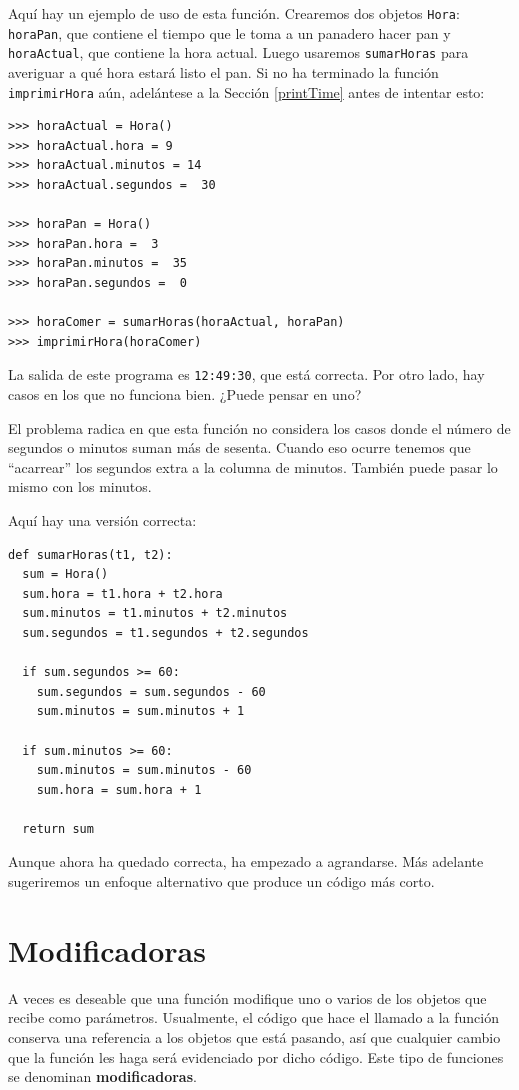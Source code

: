 Aquí hay un ejemplo de uso de esta función. Crearemos dos objetos
\texttt{Hora}: \texttt{horaPan}, que contiene el tiempo que le toma
a un panadero hacer pan y \texttt{horaActual}, que contiene la hora
actual. Luego usaremos \texttt{sumarHoras} para averiguar a qué hora
estará listo el pan. Si no ha terminado la función \texttt{imprimirHora}
aún, adelántese a la Sección \ref{printTime} antes de intentar esto:

\begin{verbatim}
>>> horaActual = Hora()
>>> horaActual.hora = 9
>>> horaActual.minutos = 14
>>> horaActual.segundos =  30

>>> horaPan = Hora()
>>> horaPan.hora =  3
>>> horaPan.minutos =  35
>>> horaPan.segundos =  0

>>> horaComer = sumarHoras(horaActual, horaPan)
>>> imprimirHora(horaComer)
\end{verbatim}
 La salida de este programa es \texttt{12:49:30}, que está correcta.
Por otro lado, hay casos en los que no funciona bien. ¿Puede pensar
en uno?

El problema radica en que esta función no considera los casos donde
el número de segundos o minutos suman más de sesenta. Cuando eso ocurre
tenemos que ``acarrear'' los segundos extra a la columna de minutos.
También puede pasar lo mismo con los minutos.

Aquí hay una versión correcta:
\begin{verbatim}
def sumarHoras(t1, t2):
  sum = Hora()
  sum.hora = t1.hora + t2.hora
  sum.minutos = t1.minutos + t2.minutos
  sum.segundos = t1.segundos + t2.segundos

  if sum.segundos >= 60:
    sum.segundos = sum.segundos - 60
    sum.minutos = sum.minutos + 1

  if sum.minutos >= 60:
    sum.minutos = sum.minutos - 60
    sum.hora = sum.hora + 1

  return sum
\end{verbatim}

Aunque ahora ha quedado correcta, ha empezado a agrandarse. Más adelante
sugeriremos un enfoque alternativo que produce un código más corto.

\section{Modificadoras}

\label{increment}  

A veces es deseable que una función modifique uno o varios de los
objetos que recibe como parámetros. Usualmente, el código que hace
el llamado a la función conserva una referencia a los objetos que
está pasando, así que cualquier cambio que la función les haga será
evidenciado por dicho código. Este tipo de funciones se denominan
\textbf{modificadoras}.

